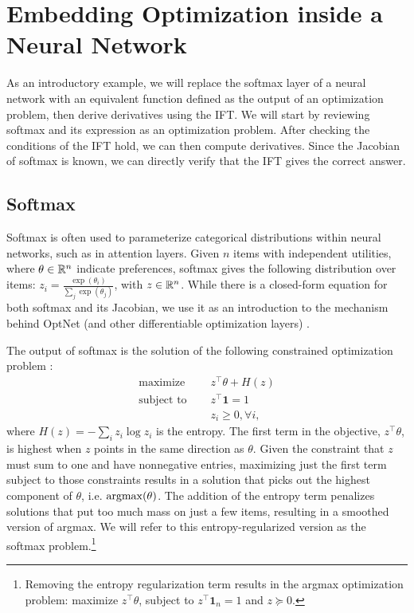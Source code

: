 \documentclass[11pt]{article}
\begin{document}
\section{Embedding Optimization inside a Neural Network}
As an introductory example,
we will replace the softmax layer of a neural network with an equivalent function
defined as the output of an optimization problem, then derive derivatives using the IFT.
We will start by reviewing softmax and its expression as an optimization problem.
After checking the conditions of the IFT hold, we can then compute derivatives.
Since the Jacobian of softmax is known, we can directly verify that the IFT gives
the correct answer.

\subsection{Softmax}
Softmax is often used to parameterize categorical distributions within neural networks,
such as in attention layers.
Given $n$ items with independent utilities, where $\theta \in \mathbb{R}^n$
indicate preferences,
softmax gives the following distribution over items:
$z_i = \frac{\exp(\theta_i)}{\sum_j \exp(\theta_j)}$, with $z\in\mathbb{R}^n$.
While there is a closed-form equation
for both softmax and its Jacobian,
we use it as an introduction to the mechanism
behind OptNet (and other differentiable optimization layers)
\citep{optnet,agrawal2019diffcvx}.

The output of softmax is the solution of the following constrained optimization problem
\citep{gao2018properties}:
\begin{equation}
\label{eqn:softmax-opt}
\begin{aligned}
\textrm{maximize } \quad & z^\top\theta + H(z)\\
\textrm{subject to } \quad & z^\top \mathbf{1} = 1\\
& z_i \geq 0, \forall i,
\end{aligned}
\end{equation}
where $H(z) = -\sum_i z_i \log z_i$ is the entropy.
The first term in the objective, $z^\top\theta$, is highest when $z$ points in the
same direction as $\theta$.
Given the constraint that $z$ must sum to one and have nonnegative entries,
maximizing just the first term subject to those constraints results in a solution
that picks out the highest component of $\theta$, i.e. $\operatorname*{argmax}(\theta)$.
The addition of the entropy term penalizes solutions that put too much
mass on just a few items, resulting in a smoothed version of argmax.
We will refer to this entropy-regularized version as the softmax problem.\footnote{
Removing the entropy regularization term results in the argmax optimization problem:
maximize $z^\top\theta$, subject to $z^\top\mathbf{1}_n=1$
and $z \succeq 0$.
}
\end{document}
